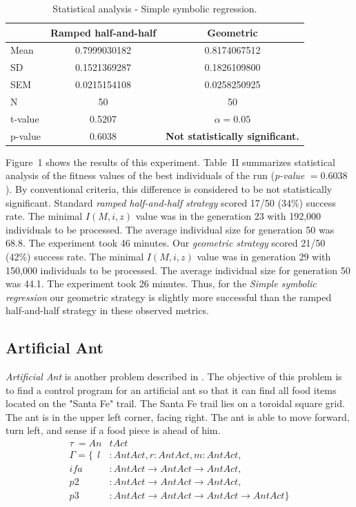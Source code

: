 \documentclass[conference]{IEEEtran}
\newcommand{\ar}{\rightarrow\xspace}
\begin{document}
\begin{table}[!t]
\caption{Statistical analysis - Simple symbolic regression.}
\centering
\begin{tabular}{|l|cc|}
\hline
& Ramped half-and-half & Geometric \\
\hline
Mean & 0.7999030182 & 0.8174067512 \\
SD	 & 0.1521369287	& 0.1826109800 \\
SEM	 & 0.0215154108	& 0.0258250925 \\
N	 & 50 & 50  \\
\hline
t-value & 0.5207 & $\alpha = 0.05$\\
p-value & 0.6038 & \textbf{Not statistically significant.}\\
\hline
\end{tabular}
\end{table}

Figure~1 shows the results of this experiment. 
Table~II summarizes statistical analysis
of the fitness values of the best individuals of the run 
(\textit{p-value} $ = 0.6038$).  
By conventional criteria, this difference is considered to be not statistically significant.
Standard \textit{ramped half-and-half strategy} scored 17/50 (34\%) success rate. 
The minimal $I(M,i,z)$ value was in the generation 23 with 192,000 individuals to be processed.
The average individual size for generation 50 was 68.8.
The experiment took 46 minutes.
Our \textit{geometric strategy} scored 21/50 (42\%) success rate. 
The minimal $I(M,i,z)$ value was in generation 29 with 150,000 individuals to be processed.
The average individual size for generation 50 was 44.1.
The experiment took 26 minutes.
Thus, for the \textit{Simple symbolic regression}
our geometric strategy is slightly more successful than 
the ramped half-and-half strategy in these observed metrics.



\subsection{Artificial Ant}
\textit{Artificial Ant} is another problem described
in \cite{koza92}. The objective of this problem is to 
find a control program for an artificial ant so
that it can find all food items located on the "Santa Fe" trail.
The Santa Fe trail lies on a toroidal square grid.
The ant is in the upper left corner, facing right.
The ant is able to move forward, turn left, and sense if a food 
piece is ahead of him.
\begin{align*}
\tau~ = An&tAct\\
\Gamma = \{~~
  l    &: AntAct                              ,
  r    : AntAct                               ,
  m    : AntAct                               ,\\
  ifa  &: AntAct \ar AntAct \ar AntAct  ,\\
  p2   &: AntAct \ar AntAct \ar AntAct  ,\\
  p3   &: AntAct \ar AntAct \ar AntAct \ar AntAct  \}
\end{align*}
\end{document}
